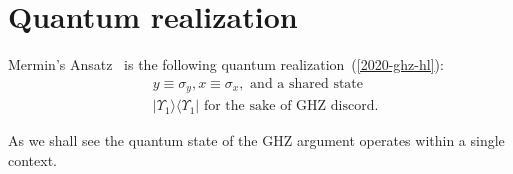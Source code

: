 \documentclass[sn-mathphys]{sn-jnl}%
\theoremstyle{thmstyleone}%
\theoremstyle{thmstyletwo}%
\theoremstyle{thmstylethree}%
\begin{document}
\section{Quantum realization}

Mermin's Ansatz~\cite{mermin} is the following quantum realization~(\ref{2020-ghz-hl}):
\begin{equation}
\begin{aligned}
&{{y}}  \equiv \sigma_y  ,
{{x}}  \equiv \sigma_x  , \textrm{ and a shared state} \\
&\vert \Upsilon_1  \rangle  \langle   \Upsilon_1  \vert \textrm{ for the sake of GHZ discord}
.
\end{aligned}
\label{2020-ghz-hlqm}
\end{equation}

As we shall see the quantum state of the GHZ argument operates within a single context.
\end{document}
